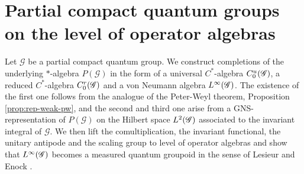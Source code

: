 \section{Partial compact quantum groups on the level of operator algebras}


Let $\mathscr{G}$ be a partial compact quantum group. We construct
completions of the underlying $*$-algebra $P(\mathscr{G})$ in the form
of a universal $C^{*}$-algebra $C^{u}_{0}(\mathscr{G})$, a reduced $C^{*}$-algebra
$C^{r}_{0}(\mathscr{G})$ and a von Neumann algebra $L^{\infty}(\mathscr{G})$. The existence of the first
one follows from the analogue of the Peter-Weyl theorem, Proposition \ref{prop:rep-weak-pw}, and the second and
third one arise from a GNS-representation of $P(\mathscr{G})$ on the
Hilbert space $L^{2}(\mathscr{G})$ associated to the invariant integral of
$\mathscr{G}$.  We then lift the comultiplication, the invariant
functional, the unitary antipode and the scaling group to level of
operator algebras and show that $L^{\infty}(\mathscr{G})$ becomes a measured quantum
groupoid in the sense of Lesieur \cite{Les1} and Enock \cite{Eno2}.

